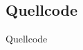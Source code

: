 \documentclass[
	12pt,
	a4paper,
	cleardoubleempty, 
	idxtotoc,
	english,
	openright
	final,
	listof=nochaptergap,
	]{scrbook}
\begin{document}


\let\chaptermark\oldchaptermark

\begin{appendices}
\chapter{Quellcode}
Quellcode
\newpage
\end{appendices}
\end{document}
